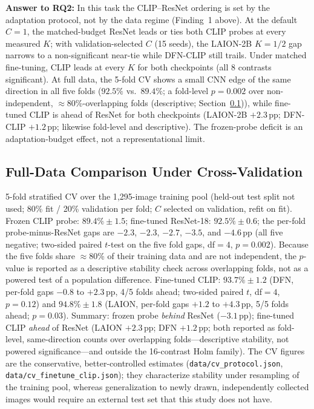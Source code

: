 \documentclass[10pt,a4paper]{article}
\begin{document}
\textbf{Answer to RQ2:} In this task the CLIP--ResNet ordering is set by the adaptation protocol, not by the data regime (Finding~1 above). At the default $C{=}1$, the matched-budget ResNet leads or ties both CLIP probes at every measured $K$; with validation-selected $C$ (15 seeds), the LAION-2B $K{=}1/2$ gap narrows to a non-significant near-tie while DFN-CLIP still trails. Under matched fine-tuning, CLIP leads at every $K$ for both checkpoints (all 8 contrasts significant). At full data, the 5-fold CV shows a small CNN edge of the same direction in all five folds ($92.5\%$ vs.\ $89.4\%$; a fold-level $p{=}0.002$ over non-independent, $\approx$80\%-overlapping folds (descriptive; Section~\ref{sec:cv})), while fine-tuned CLIP is ahead of ResNet for both checkpoints (LAION-2B $+2.3$\,pp; DFN-CLIP $+1.2$\,pp; likewise fold-level and descriptive). The frozen-probe deficit is an adaptation-budget effect, not a representational limit.

\subsection{Full-Data Comparison Under Cross-Validation}
\label{sec:cv}

5-fold stratified CV over the 1{,}295-image training pool (held-out test split not used; 80\% fit / 20\% validation per fold; $C$ selected on validation, refit on fit). Frozen CLIP probe: $89.4\%\pm1.5$; fine-tuned ResNet-18: $92.5\%\pm0.6$; the per-fold probe-minus-ResNet gaps are $-2.3$, $-2.3$, $-2.7$, $-3.5$, and $-4.6$\,pp (all five negative; two-sided paired $t$-test on the five fold gaps, df$=4$, $p{=}0.002$). Because the five folds share $\approx$80\% of their training data and are not independent, the $p$-value is reported as a descriptive stability check across overlapping folds, not as a powered test of a population difference. Fine-tuned CLIP: $93.7\%\pm1.2$ (DFN, per-fold gaps $-0.8$ to $+2.3$\,pp, 4/5 folds ahead; two-sided paired $t$, df$=4$, $p{=}0.12$) and $94.8\%\pm1.8$ (LAION, per-fold gaps $+1.2$ to $+4.3$\,pp, 5/5 folds ahead; $p{=}0.03$). Summary: frozen probe \emph{behind} ResNet ($-3.1$\,pp); fine-tuned CLIP \emph{ahead} of ResNet (LAION $+2.3$\,pp; DFN $+1.2$\,pp; both reported as fold-level, same-direction counts over overlapping folds---descriptive stability, not powered significance---and outside the 16-contrast Holm family). The CV figures are the conservative, better-controlled estimates (\texttt{data/cv\_protocol.json}, \texttt{data/cv\_finetune\_clip.json}); they characterize stability under resampling of the training pool, whereas generalization to newly drawn, independently collected images would require an external test set that this study does not have.
\end{document}

